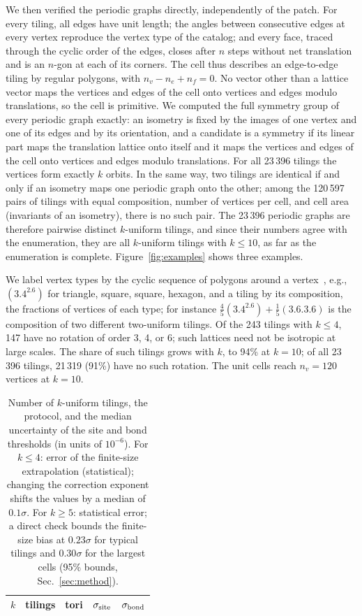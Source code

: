 \documentclass[pre,twocolumn,superscriptaddress,longbibliography,floatfix]{revtex4-2}
\begin{document}
We then verified the periodic graphs directly, independently of the patch. For every tiling, all edges have unit length; the angles between consecutive edges at every vertex reproduce the vertex type of the catalog; and every face, traced through the cyclic order of the edges, closes after $n$ steps without net translation and is an $n$-gon at each of its corners. The cell thus describes an edge-to-edge tiling by regular polygons, with $n_v-n_e+n_f=0$. No vector other than a lattice vector maps the vertices and edges of the cell onto vertices and edges modulo translations, so the cell is primitive. We computed the full symmetry group of every periodic graph exactly: an isometry is fixed by the images of one vertex and one of its edges and by its orientation, and a candidate is a symmetry if its linear part maps the translation lattice onto itself and it maps the vertices and edges of the cell onto vertices and edges modulo translations. For all 23\,396 tilings the vertices form exactly $k$ orbits. In the same way, two tilings are identical if and only if an isometry maps one periodic graph onto the other; among the 120\,597 pairs of tilings with equal composition, number of vertices per cell, and cell area (invariants of an isometry), there is no such pair. The 23\,396 periodic graphs are therefore pairwise distinct $k$-uniform tilings, and since their numbers agree with the enumeration, they are all $k$-uniform tilings with $k\le10$, as far as the enumeration is complete. Figure~\ref{fig:examples} shows three examples.

We label vertex types by the cyclic sequence of polygons around a vertex~\cite{GrunbaumShephard87}, e.g., $(3.4^2.6)$ for triangle, square, square, hexagon, and a tiling by its composition, the fractions of vertices of each type; for instance $\tfrac45(3.4^2.6)+\tfrac15(3.6.3.6)$ is the composition of two different two-uniform tilings. Of the 243 tilings with $k\le4$, 147 have no rotation of order 3, 4, or 6; such lattices need not be isotropic at large scales. The share of such tilings grows with $k$, to 94\% at $k=10$; of all 23\,396 tilings, 21\,319 (91\%) have no such rotation. The unit cells reach $n_v=120$ vertices at $k=10$.

\begin{table}
\caption{Number of $k$-uniform tilings, the protocol, and the median uncertainty of the site and bond thresholds (in units of $10^{-6}$). For $k\le4$: error of the finite-size extrapolation (statistical); changing the correction exponent shifts the values by a median of $0.1\sigma$. For $k\ge5$: statistical error; a direct check bounds the finite-size bias at $0.23\sigma$ for typical tilings and $0.30\sigma$ for the largest cells (95\% bounds, Sec.~\ref{sec:method}).}
\label{tab:counts}
\begin{ruledtabular}
\begin{tabular}{rrlrr}
$k$ & tilings & tori & $\sigma_{\rm site}$ & $\sigma_{\rm bond}$\\
\hline

\end{tabular}
\end{ruledtabular}
\end{table}
\end{document}

